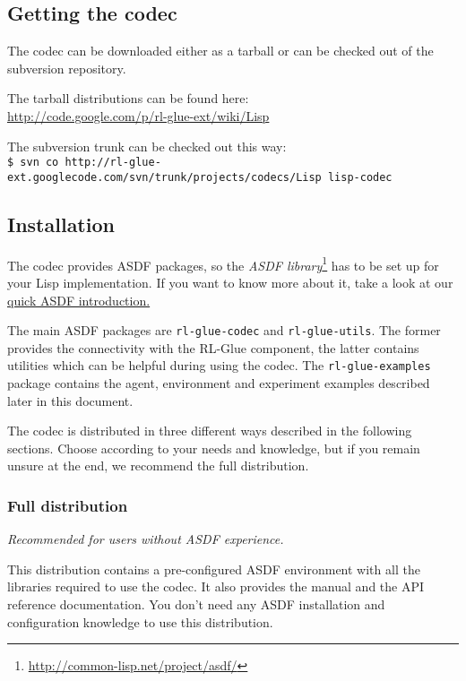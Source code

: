 \documentclass[11pt,a4paper,dvipdfm]{article}
\newcommand{\selfref}[1]{\href{#1}{#1}}
\newcommand{\footref}[2]{\textsl{#1}\footnote{\selfref{#2}}}
\newcommand{\prompttext}[1]{\texttt{#1}}
\newcommand{\shprompt}[1]{\prompttext{\$ #1}}
\begin{document}
\subsection{Getting the codec}

The codec can be downloaded either as a tarball or can be checked out of the
subversion repository.

The tarball distributions can be found here: \\
\selfref{http://code.google.com/p/rl-glue-ext/wiki/Lisp}

The subversion trunk can be checked out this way: \\
\shprompt{svn co
          http://rl-glue-ext.googlecode.com/svn/trunk/projects/codecs/Lisp
          lisp-codec}

\subsection{Installation}

The codec provides ASDF packages, so the
\footref{ASDF library}{http://common-lisp.net/project/asdf/} has to be set up
for your Lisp implementation. If you want to know more about it, take a look
at our \hyperlink{asdfintro}{quick ASDF introduction.}

The main ASDF packages are \prompttext{rl-glue-codec} and
\prompttext{rl-glue-utils}. The former provides the connectivity with the
RL-Glue component, the latter contains utilities which can be helpful during
using the codec. The \prompttext{rl-glue-examples} package contains the
agent, environment and experiment examples described later in this document.

The codec is distributed in three different ways described in the following
sections. Choose according to your needs and knowledge, but if you remain
unsure at the end, we recommend the full distribution.

\subsubsection{Full distribution}

\textsl{Recommended for users without ASDF experience.}

This distribution contains a pre-configured ASDF environment with all the
libraries required to use the codec. It also provides the manual and the
API reference documentation. You don't need any ASDF installation and
configuration knowledge to use this distribution.
\end{document}
